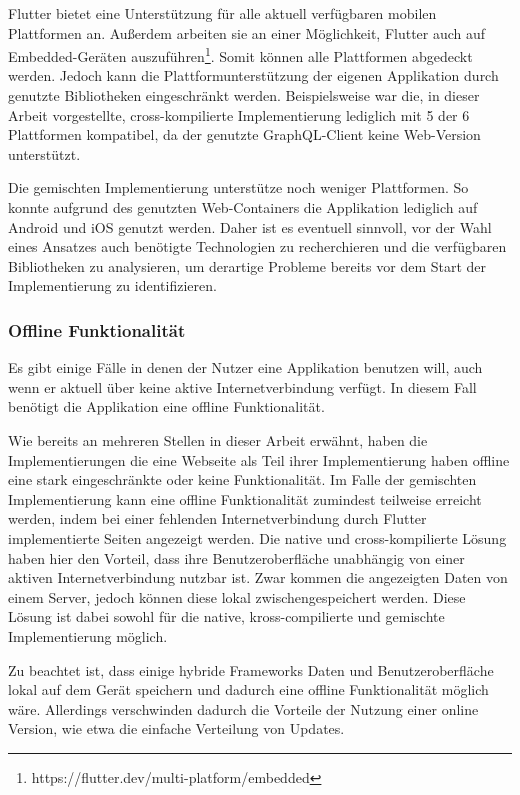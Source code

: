 Flutter bietet eine Unterstützung für alle aktuell verfügbaren mobilen Plattformen an. Außerdem arbeiten sie an einer Möglichkeit, Flutter auch auf Embedded-Geräten auszuführen\footnote{https://flutter.dev/multi-platform/embedded}.
Somit können alle Plattformen abgedeckt werden. Jedoch kann die Plattformunterstützung der eigenen Applikation durch genutzte Bibliotheken eingeschränkt werden. Beispielsweise war die, in dieser Arbeit vorgestellte, cross-kompilierte Implementierung lediglich mit 5 der 6 Plattformen kompatibel, da der genutzte GraphQL-Client keine Web-Version unterstützt.

Die gemischten Implementierung unterstütze noch weniger Plattformen. So konnte aufgrund des genutzten Web-Containers die Applikation lediglich auf Android und iOS genutzt werden.
Daher ist es eventuell sinnvoll, vor der Wahl eines Ansatzes auch benötigte Technologien zu recherchieren und die verfügbaren Bibliotheken zu analysieren, um derartige Probleme bereits vor dem Start der Implementierung zu identifizieren.


\subsubsection{Offline Funktionalität}
Es gibt einige Fälle in denen der Nutzer eine Applikation benutzen will, auch wenn er aktuell über keine aktive Internetverbindung verfügt. In diesem Fall benötigt die Applikation eine offline Funktionalität.

Wie bereits an mehreren Stellen in dieser Arbeit erwähnt, haben die Implementierungen die eine Webseite als Teil ihrer Implementierung haben offline eine stark eingeschränkte oder keine Funktionalität. Im Falle der gemischten Implementierung kann eine offline Funktionalität zumindest teilweise erreicht werden, indem bei einer fehlenden Internetverbindung durch Flutter implementierte Seiten angezeigt werden. Die native und cross-kompilierte Lösung haben hier den Vorteil, dass ihre Benutzeroberfläche unabhängig von einer aktiven Internetverbindung nutzbar ist. Zwar kommen die angezeigten Daten von einem Server, jedoch können diese lokal zwischengespeichert werden. Diese Lösung ist dabei sowohl für die native, kross-compilierte und gemischte Implementierung möglich. 

Zu beachtet ist, dass einige hybride Frameworks Daten und Benutzeroberfläche lokal auf dem Gerät speichern und dadurch eine offline Funktionalität möglich wäre. Allerdings verschwinden dadurch die Vorteile der Nutzung einer online Version, wie etwa die einfache Verteilung von Updates.

